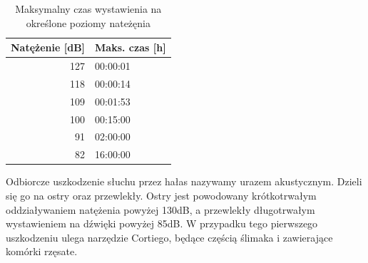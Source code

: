 \begin{table}[H]
	\centering
	\begin{tabular}{|r|l|}
		\hline
		Natężenie [dB] & Maks. czas [h] \\
		\hline
		\hline
		127 & 00:00:01 \\
		\hline
		118 & 00:00:14 \\
		\hline
		109 & 00:01:53 \\
		\hline
		100 & 00:15:00 \\
		\hline
		91 & 02:00:00 \\
		\hline
		82 & 16:00:00 \\
		\hline
	\end{tabular}
	\caption{Maksymalny czas wystawienia na określone poziomy nateżęnia \cite{SPLtable}}
	\label{tab:SPLczas}
\end{table}

Odbiorcze uszkodzenie słuchu przez hałas nazywamy urazem akustycznym. Dzieli się go na ostry oraz przewlekły. Ostry jest powodowany krótkotrwałym oddziaływaniem natężenia powyżej 130dB, a przewlekły długotrwałym wystawieniem na dźwięki powyżej 85dB. W przypadku tego pierwszego uszkodzeniu ulega narzędzie Cortiego, będące częścią ślimaka i zawierające komórki rzęsate\cite{UrazyAkustyczne}.

